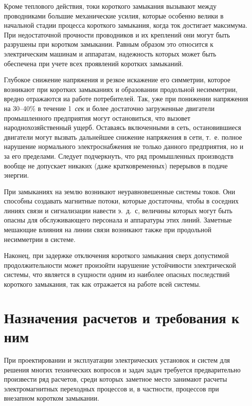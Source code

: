 Кроме теплового действия, токи короткого замыкания вызывают между проводниками большие механические усилия, которые особенно велики в начальной стадии процесса короткого замыкания, когда ток достигает максимума. При недостаточной прочности проводников и их креплений они могут быть разрушены при коротком замыкании. Равным образом это относится к электрическим машинам и аппаратам, надежность которых может быть обеспечена при учете всех проявлений коротких замыканий.

Глубокое снижение напряжения и резкое искажение его симметрии, которое возникают при коротких замыканиях и образовании продольной несимметрии, вредно отражаются иа работе потребителей. Так, уже при понижении напряжения на 30--40\% в течение 1~\textit{сек} и более достаточно загруженные двигатели промышленного предприятия могут остановиться, что вызовет народнохозяйственный ущерб. Оставаясь включенными в сеть, остановившиеся двигатели могут вызвать дальнейшее снижение напряжения в сети, т.~е. полное нарушение нормального электроснабжения не только данного предприятия, но и за его пределами. Следует подчеркнуть, что ряд промышленных производств вообще не допускает никаких (даже кратковременных) перерывов в подаче энергии.

При замыканиях на землю возникают неуравновешенные системы токов. Они способны создавать магнитные потоки, которые достаточны, чтобы в соседних линиях связи и сигнализации навести э.~д.~с, величины которых могут быть опасны для обслуживающего персонала и аппаратуры этих линий. Заметные мешающие влияния на линии связи возникают также при продольной несимметрии в системе.

Наконец, при задержке отключения короткого замыкания сверх допустимой продолжительности может произойти нарушение устойчивости электрической системы, что является в сущности одним из наиболее опасных последствий короткого замыкания, так как отражается на работе всей системы.

\section{Назначения расчетов и требования к ним}

При проектировании и эксплуатации электрических установок и систем для решения многих технических вопросов и задач задач требуется предварительно произвести ряд расчетов, среди которых заметное место занимают расчеты электромагнитных переходных процессов и, в частности, процессов при внезапном коротком замыкании.

